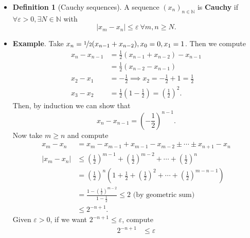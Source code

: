 \documentclass{article}
\newcommand{\N}{\mathbb{N}}
\newcommand{\seq}[2]{(#1_{#2})_{#2 \in \N}}
\newcommand{\?}{\stackrel{?}{=}}
\theoremstyle{definition} %
\newtheorem{definition}[theorem]{Definition} %
\begin{document}
\begin{itemize}
    \item[]
          \begin{definition}[Cauchy sequences]
              A sequence $\seq{x}{n}$ is \textbf{Cauchy} if $\forall \varepsilon > 0, \exists N \in \N$ with
              $$|x_m - x_n| \leq \varepsilon \ \forall m, n \geq N.$$
          \end{definition}
    \item \textbf{Example}. Take $x_n = \nicefrac{1}{2}(x_{n - 1} + x_{n - 2}), x_0 = 0, x_1 = 1$. Then we compute
          \begin{align*}
              x_n - x_{n - 1} & = \frac{1}{2}(x_{n - 1} + x_{n - 2}) - x_{n - 1}             \\
                              & = \frac{1}{2}(x_{n - 2} - x_{n - 1})                         \\
              x_2 - x_1       & = -\frac{1}{2} \implies x_2 = -\frac{1}{2} + 1 = \frac{1}{2} \\
              x_3 - x_2       & = \frac{1}{2}(1 - \frac{1}{2}) = \left(\frac{1}{2}\right)^2.
          \end{align*}
          Then, by induction we can show that
          $$x_n - x_{n - 1} = \left(-\frac{1}{2}\right)^{n - 1}.$$
          Now take $m \geq n$ and compute
          \begin{align*}
              x_m - x_n   & = x_m - x_{m - 1} + x_{m - 1} - x_{m - 2} \pm \cdots \pm x_{n + 1} - x_n                                                              \\
              |x_m - x_n| & \leq \left(\frac{1}{2}\right)^{m - 1} + \left(\frac{1}{2}\right)^{m - 2} + \cdots + \left(\frac{1}{2}\right)^n                        \\
                          & = \left(\frac{1}{2}\right)^n\left(1 + \frac{1}{2} + \left(\frac{1}{2}\right)^2 + \cdots + \left(\frac{1}{2}\right)^{m - n - 1}\right) \\
                          & = \frac{1 - \left(\frac{1}{2}\right)^{m - 2}}{1 - \frac{1}{2}} \leq 2 \text{ (by geometric sum)}                                      \\
                          & \leq 2^{-n + 1}.
          \end{align*}
          Given $\varepsilon > 0$, if we want $2^{-n + 1} \leq \varepsilon$, compute
          \begin{align*}
              2^{-n + 1} & \leq \varepsilon      \\

\end{align*}
\end{itemize}
\end{document}
